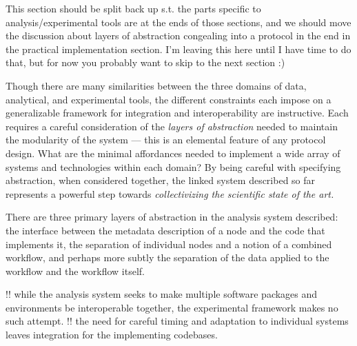 \documentclass[10pt]{article}
\begin{document}
\begin{multicols}{2}


This section should be split back up s.t. the parts specific to
analysis/experimental tools are at the ends of those sections, and we
should move the discussion about layers of abstraction congealing into a
protocol in the end in the practical implementation section. I'm leaving
this here until I have time to do that, but for now you probably want to
skip to the next section :)

Though there are many similarities between the three domains of data,
analytical, and experimental tools, the different constraints each
impose on a generalizable framework for integration and interoperability
are instructive. Each requires a careful consideration of the
\emph{layers of abstraction} needed to maintain the modularity of the
system --- this is an elemental feature of any protocol design. What are
the minimal affordances needed to implement a wide array of systems and
technologies within each domain? By being careful with specifying
abstraction, when considered together, the linked system described so
far represents a powerful step towards \emph{collectivizing the
scientific state of the art.}

There are three primary layers of abstraction in the analysis system
described: the interface between the metadata description of a node and
the code that implements it, the separation of individual nodes and a
notion of a combined workflow, and perhaps more subtly the separation of
the data applied to the workflow and the workflow itself.

!! while the analysis system seeks to make multiple software packages
and environments be interoperable together, the experimental framework
makes no such attempt. !! the need for careful timing and adaptation to
individual systems leaves integration for the implementing codebases.


\end{multicols}
\end{document}

